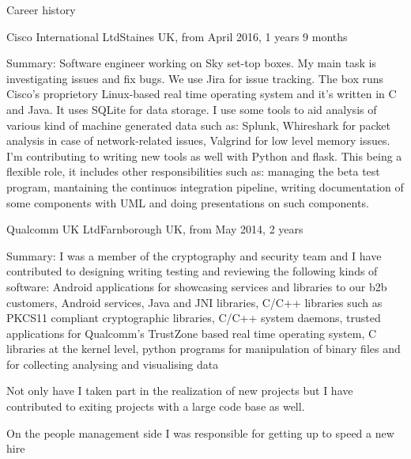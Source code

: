 \documentclass{resume}
\begin{document}
  \begin{rSection}{Career history}
    \begin{rSubsection}{Cisco International Ltd}{Staines UK, from April 2016, 1 years 9 months}{}{}
    \item[Summary:]
      Software engineer working on Sky set-top boxes.
      My main task is investigating issues and fix bugs. 
      We use Jira for issue tracking. 
      The box runs Cisco's proprietory Linux-based real time operating system and it's written in C and Java. It uses SQLite for data storage.
      I use some tools to aid analysis of various kind of machine generated data such as: Splunk, Whireshark for packet analysis in case of network-related issues, Valgrind for low level memory issues.
      I'm contributing to writing new tools as well with Python and flask.
      This being a flexible role, it includes other responsibilities such as: managing the beta test program, mantaining the continuos integration pipeline, writing documentation of some components with UML and doing presentations on such components.
    \end{rSubsection}

    \begin{rSubsection}{Qualcomm UK Ltd}{Farnborough UK, from May 2014, 2 years}{}{}
	\item[Summary:]
	  I was a member of the cryptography and security team and I have contributed to designing writing testing and reviewing the following kinds of software:
	  Android applications for showcasing services and libraries to our b2b customers,
	  Android services, 
	  Java and JNI libraries, 
	  C/C++ libraries such as PKCS11 compliant cryptographic libraries,
	  C/C++ system daemons,
	  trusted applications for Qualcomm's TrustZone based real time operating system,
	  C libraries at the kernel level,
	  python programs for manipulation of binary files and for collecting analysing and visualising data

	  Not only have I taken part in the realization of new projects but I have contributed to exiting projects with a large code base as well.

	  On the people management side I was responsible for getting up to speed a new hire
	  

\end{rSubsection}
\end{rSection}
\end{document}
